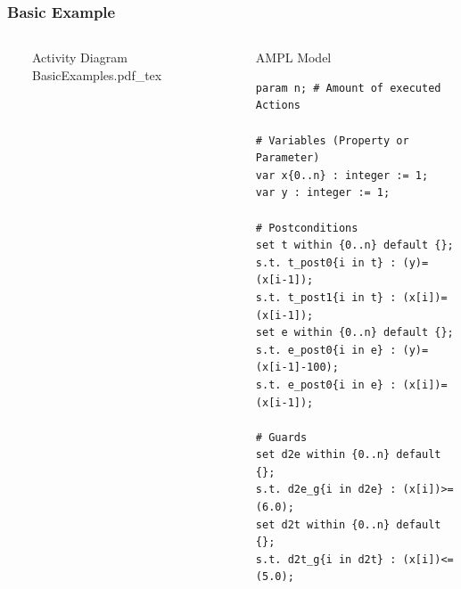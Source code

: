 \documentclass{beamer}
\begin{document}
\begin{frame}[fragile]
\frametitle{Basic Example}
\begin{columns}
  \ 
	\begin{block}{Activity Diagram} 
	\def\svgwidth{\textwidth}
	\scriptsize
	{BasicExamples.pdf_tex}
	\end{block} 
\column{.56\textwidth} \ 
	\begin{block}{AMPL Model} 
		\begin{lstlisting}[basicstyle=\ttfamily\scriptsize,language=ampl]
param n; # Amount of executed Actions

# Variables (Property or Parameter)
var x{0..n} : integer := 1;
var y : integer := 1;

# Postconditions
set t within {0..n} default {};
s.t. t_post0{i in t} : (y)=(x[i-1]);
s.t. t_post1{i in t} : (x[i])=(x[i-1]);
set e within {0..n} default {};
s.t. e_post0{i in e} : (y)=(x[i-1]-100);
s.t. e_post0{i in e} : (x[i])=(x[i-1]);

# Guards
set d2e within {0..n} default {};
s.t. d2e_g{i in d2e} : (x[i])>=(6.0);
set d2t within {0..n} default {};
s.t. d2t_g{i in d2t} : (x[i])<=(5.0);
\end{lstlisting}
	\end{block} 
\end{columns}
\end{frame}
\end{document}
